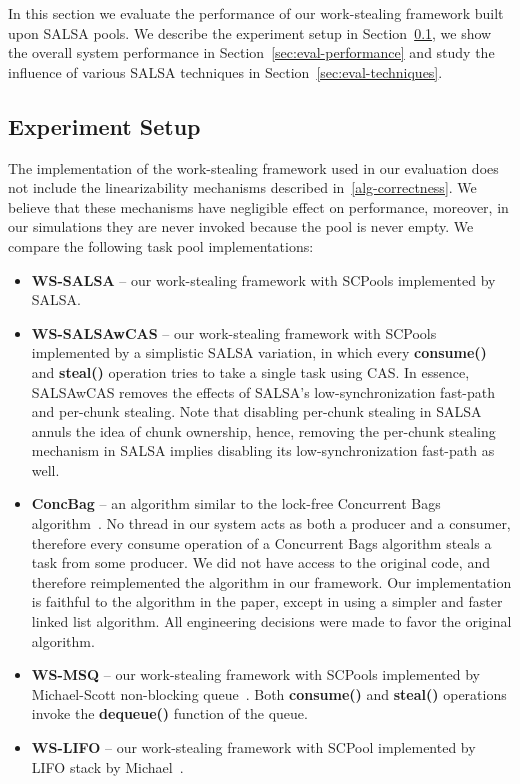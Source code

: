 In this section we evaluate the performance of our work-stealing framework built upon SALSA pools. 
We describe the experiment setup in Section~\ref{sec:exp-setup}, we show the overall system performance in Section~\ref{sec:eval-performance} and study the influence of various SALSA techniques in Section~\ref{sec:eval-techniques}.

\subsection {Experiment Setup}
\label{sec:exp-setup}
The implementation of the work-stealing framework used in our evaluation does not include the linearizability mechanisms described in~\ref{alg-correctness}. We believe that these mechanisms have negligible effect on performance, moreover, in our simulations they are never invoked because the pool is never empty. We compare the following task pool implementations:
\begin {itemize}
\item
{\bf WS-SALSA} -- our work-stealing framework with SCPools implemented by SALSA.
\item
{\bf WS-SALSAwCAS} -- our work-stealing framework with SCPools implemented by a simplistic SALSA variation, in which every {\bf consume()} and {\bf steal()} operation tries to take a single task using CAS. In essence, SALSAwCAS removes the effects of SALSA's low-synchronization fast-path and per-chunk stealing. 
Note that disabling per-chunk stealing in SALSA annuls the idea of chunk ownership, hence, removing the per-chunk stealing mechanism in SALSA implies disabling its low-synchronization fast-path as well. 
\item
{\bf ConcBag} -- an algorithm similar to the lock-free Concurrent Bags algorithm~\cite{Sundell:2011:LAC:1989493.1989550}. 
No thread in our system acts as both a producer and a consumer, therefore every consume operation of a Concurrent Bags algorithm steals a task from some producer.
We did not have access to the original code, and therefore reimplemented the algorithm in our framework. Our implementation is faithful to the algorithm in the paper, except in using a simpler and faster linked list algorithm. All engineering decisions were made to favor the original algorithm. 
\item
{\bf WS-MSQ} -- our work-stealing framework with SCPools implemented by Michael-Scott non-blocking queue~\cite{Michael:1996:SFP:248052.248106}. Both {\bf consume()} and {\bf steal()} operations invoke the {\bf dequeue()} function of the queue. 
\item
{\bf WS-LIFO} -- our work-stealing framework with SCPool implemented by LIFO stack by Michael~\cite{Michael:2004:HPS:987524.987595}. 
\end {itemize} 

